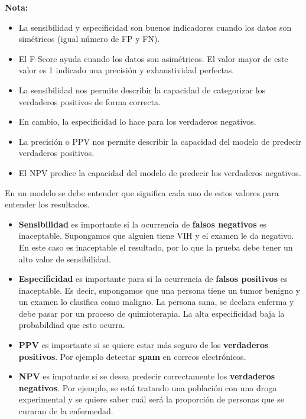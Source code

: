 \documentclass[
  12pt,
]{book}
\providecommand{\tightlist}{%
  \setlength{\itemsep}{0pt}\setlength{\parskip}{0pt}}
\theoremstyle{definition}
\theoremstyle{definition}
\theoremstyle{definition}
\theoremstyle{definition}
\theoremstyle{remark}
\begin{document}
\textbf{Nota:}

\begin{itemize}
\tightlist
\item
  La sensibilidad y especificidad son buenos indicadores cuando los datos son simétricos (igual número de FP y FN).
\item
  El F-Score ayuda cuando los datos son asimétricos. El valor mayor de este valor es 1 indicado una precisión y exhaustividad perfectas.
\item
  La sensibilidad nos permite describir la capacidad de categorizar los verdaderos positivos de forma correcta.
\item
  En cambio, la especificidad lo hace para los verdaderos negativos.
\item
  La precisión o PPV nos permite describir la capacidad del modelo de predecir verdaderos positivos.
\item
  El NPV predice la capacidad del modelo de predecir los verdaderos negativos.
\end{itemize}

En un modelo se debe entender que significa cada uno de estos valores para entender los resultados.

\begin{itemize}
\tightlist
\item
  \textbf{Sensibilidad} es importante si la ocurrencia de \textbf{falsos negativos} es inaceptable. Supongamos que alguien tiene VIH y el examen le da negativo. En este caso es inaceptable el resultado, por lo que la prueba debe tener un alto valor de sensibilidad.
\item
  \textbf{Especificidad} es importante para si la ocurrencia de \textbf{falsos positivos} es inaceptable. Es decir, supongamos que una persona tiene un tumor benigno y un examen lo clasifica como maligno. La persona sana, se declara enferma y debe pasar por un proceso de quimioterapia. La alta especificidad baja la probabildiad que esto ocurra.
\item
  \textbf{PPV} es importante si se quiere estar más seguro de los \textbf{verdaderos positivos}. Por ejemplo detectar \textbf{spam} en correos electrónicos.
\item
  \textbf{NPV} es impotante si se desea predecir correctamente los \textbf{verdaderos negativos}. Por ejemplo, se está tratando una población con una droga experimental y se quiere saber cuál será la proporción de personas que se curaran de la enfermedad.
\end{itemize}
\end{document}
